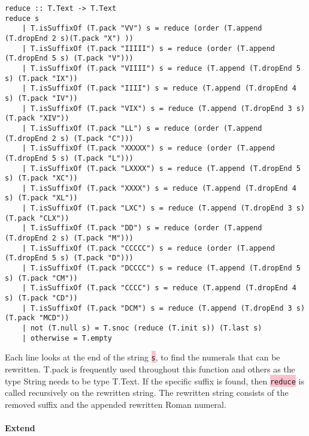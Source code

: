 \documentclass{article}
\begin{document}
\break

\begin{lstlisting}
reduce :: T.Text -> T.Text
reduce s
    | T.isSuffixOf (T.pack "VV") s = reduce (order (T.append (T.dropEnd 2 s)(T.pack "X") ))
    | T.isSuffixOf (T.pack "IIIII") s = reduce (order (T.append (T.dropEnd 5 s) (T.pack "V")))
    | T.isSuffixOf (T.pack "VIIII") s = reduce (T.append (T.dropEnd 5 s) (T.pack "IX"))
    | T.isSuffixOf (T.pack "IIII") s = reduce (T.append (T.dropEnd 4 s) (T.pack "IV"))
    | T.isSuffixOf (T.pack "VIX") s = reduce (T.append (T.dropEnd 3 s) (T.pack "XIV"))
    | T.isSuffixOf (T.pack "LL") s = reduce (order (T.append (T.dropEnd 2 s) (T.pack "C")))
    | T.isSuffixOf (T.pack "XXXXX") s = reduce (order (T.append (T.dropEnd 5 s) (T.pack "L")))
    | T.isSuffixOf (T.pack "LXXXX") s = reduce (T.append (T.dropEnd 5 s) (T.pack "XC"))
    | T.isSuffixOf (T.pack "XXXX") s = reduce (T.append (T.dropEnd 4 s) (T.pack "XL"))
    | T.isSuffixOf (T.pack "LXC") s = reduce (T.append (T.dropEnd 3 s) (T.pack "CLX"))
    | T.isSuffixOf (T.pack "DD") s = reduce (order (T.append (T.dropEnd 2 s) (T.pack "M")))
    | T.isSuffixOf (T.pack "CCCCC") s = reduce (order (T.append (T.dropEnd 5 s) (T.pack "D")))
    | T.isSuffixOf (T.pack "DCCCC") s = reduce (T.append (T.dropEnd 5 s) (T.pack "CM"))
    | T.isSuffixOf (T.pack "CCCC") s = reduce (T.append (T.dropEnd 4 s) (T.pack "CD"))
    | T.isSuffixOf (T.pack "DCM") s = reduce (T.append (T.dropEnd 3 s) (T.pack "MCD"))
    | not (T.null s) = T.snoc (reduce (T.init s)) (T.last s)
    | otherwise = T.empty
\end{lstlisting} 

Each line looks at the end of the string \colorbox{pink}{\lstinline{s}}, to find the numerals that can be rewritten. T.pack is frequently used throughout this function and others as the type String needs to be type T.Text. If the specific suffix is found, then \colorbox{pink}{\lstinline{reduce}} is called recursively on the rewritten string. The rewritten string consists of the removed suffix and the appended rewritten Roman numeral.

\paragraph{Extend}

\subparagraph{}
\end{document}
